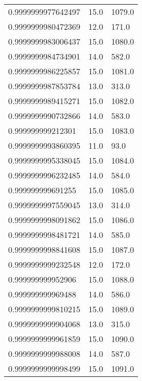 \begin{center}
\begin{supertabular}[H]{p{0.30\textwidth}p{0.05\textwidth}p{0.05\textwidth}}
0.9999999977642497 & 15.0 & 1079.0 \\ 
0.9999999980472369 & 12.0 & 171.0 \\ 
0.9999999983006437 & 15.0 & 1080.0 \\ 
0.9999999984734901 & 14.0 & 582.0 \\ 
0.9999999986225857 & 15.0 & 1081.0 \\ 
0.9999999987853784 & 13.0 & 313.0 \\ 
0.9999999989415271 & 15.0 & 1082.0 \\ 
0.9999999990732866 & 14.0 & 583.0 \\ 
0.999999999212301 & 15.0 & 1083.0 \\ 
0.9999999993860395 & 11.0 & 93.0 \\ 
0.9999999995338045 & 15.0 & 1084.0 \\ 
0.9999999996232485 & 14.0 & 584.0 \\ 
0.999999999691255 & 15.0 & 1085.0 \\ 
0.9999999997559045 & 13.0 & 314.0 \\ 
0.9999999998091862 & 15.0 & 1086.0 \\ 
0.9999999998481721 & 14.0 & 585.0 \\ 
0.9999999998841608 & 15.0 & 1087.0 \\ 
0.9999999999232548 & 12.0 & 172.0 \\ 
0.999999999952906 & 15.0 & 1088.0 \\ 
0.999999999969488 & 14.0 & 586.0 \\ 
0.9999999999810215 & 15.0 & 1089.0 \\ 
0.9999999999904068 & 13.0 & 315.0 \\ 
0.9999999999961859 & 15.0 & 1090.0 \\ 
0.9999999999988008 & 14.0 & 587.0 \\ 
0.9999999999998499 & 15.0 & 1091.0 \\ 
\end{supertabular}
\end{center}
